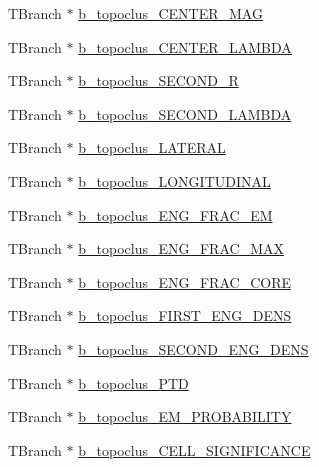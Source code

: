 \begin{DoxyCompactItemize}
T\+Branch $\ast$ \hyperlink{classCollectionTree_a2d15fc567cb6cdf5d657f12e9f3a4eb4}{b\+\_\+topoclus\+\_\+\+C\+E\+N\+T\+E\+R\+\_\+\+M\+AG}
\item 
T\+Branch $\ast$ \hyperlink{classCollectionTree_aa96f46ed9c432f90aa9daf519e4727ab}{b\+\_\+topoclus\+\_\+\+C\+E\+N\+T\+E\+R\+\_\+\+L\+A\+M\+B\+DA}
\item 
T\+Branch $\ast$ \hyperlink{classCollectionTree_a52c84c294a9beb09d9ac3b3e300ac9dd}{b\+\_\+topoclus\+\_\+\+S\+E\+C\+O\+N\+D\+\_\+R}
\item 
T\+Branch $\ast$ \hyperlink{classCollectionTree_abf662462e9337be433c7ce4b9ef77164}{b\+\_\+topoclus\+\_\+\+S\+E\+C\+O\+N\+D\+\_\+\+L\+A\+M\+B\+DA}
\item 
T\+Branch $\ast$ \hyperlink{classCollectionTree_ad2a15dd7e5f8f59e0288595a18c438f3}{b\+\_\+topoclus\+\_\+\+L\+A\+T\+E\+R\+AL}
\item 
T\+Branch $\ast$ \hyperlink{classCollectionTree_aeaef3bf0e4f43b6f3f60921145ac6407}{b\+\_\+topoclus\+\_\+\+L\+O\+N\+G\+I\+T\+U\+D\+I\+N\+AL}
\item 
T\+Branch $\ast$ \hyperlink{classCollectionTree_ae3c1d91f80bebd4e7d3b3e47a4e9763c}{b\+\_\+topoclus\+\_\+\+E\+N\+G\+\_\+\+F\+R\+A\+C\+\_\+\+EM}
\item 
T\+Branch $\ast$ \hyperlink{classCollectionTree_acc4f19489af080a2a5f854c1d80f826f}{b\+\_\+topoclus\+\_\+\+E\+N\+G\+\_\+\+F\+R\+A\+C\+\_\+\+M\+AX}
\item 
T\+Branch $\ast$ \hyperlink{classCollectionTree_a6ec1001c400ab10527c5e1b325a24aa8}{b\+\_\+topoclus\+\_\+\+E\+N\+G\+\_\+\+F\+R\+A\+C\+\_\+\+C\+O\+RE}
\item 
T\+Branch $\ast$ \hyperlink{classCollectionTree_ad592d57299bd002b9e64df0145839cf9}{b\+\_\+topoclus\+\_\+\+F\+I\+R\+S\+T\+\_\+\+E\+N\+G\+\_\+\+D\+E\+NS}
\item 
T\+Branch $\ast$ \hyperlink{classCollectionTree_ab437e2ba94f6e8ae0906452743418e59}{b\+\_\+topoclus\+\_\+\+S\+E\+C\+O\+N\+D\+\_\+\+E\+N\+G\+\_\+\+D\+E\+NS}
\item 
T\+Branch $\ast$ \hyperlink{classCollectionTree_a2c548edbfefdd2010693f72c26687fcc}{b\+\_\+topoclus\+\_\+\+P\+TD}
\item 
T\+Branch $\ast$ \hyperlink{classCollectionTree_a0a24c8d23ae2e56b78eb0652bf7b478d}{b\+\_\+topoclus\+\_\+\+E\+M\+\_\+\+P\+R\+O\+B\+A\+B\+I\+L\+I\+TY}
\item 
T\+Branch $\ast$ \hyperlink{classCollectionTree_a776d2456af393c9621ef7fbf0867da05}{b\+\_\+topoclus\+\_\+\+C\+E\+L\+L\+\_\+\+S\+I\+G\+N\+I\+F\+I\+C\+A\+N\+CE}

\end{DoxyCompactItemize}
